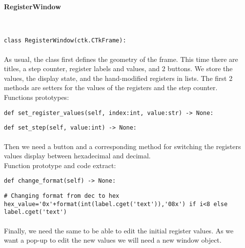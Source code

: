 \documentclass{article}
\newcommand{\subsubsubsection}[1]{\paragraph{#1}\mbox{}\\}
\begin{document}
\paragraph{}
\subsubsubsection{RegisterWindow}
\begin{lstlisting}[language=MyPython]
class RegisterWindow(ctk.CTkFrame):
\end{lstlisting}
\paragraph{}

As usual, the class first defines the geometry of the frame. This time there are titles, a step counter, register labels and values, and 2 buttons. We store the values, the display state, and the hand-modified registers in lists. The first 2 methods are setters for the values of the registers and the step counter. \\
Functions prototypes: \\

\begin{lstlisting}[language=MyPython]
def set_register_values(self, index:int, value:str) -> None:
\end{lstlisting}
\begin{lstlisting}[language=MyPython]
def set_step(self, value:int) -> None:
\end{lstlisting}
\paragraph{}

Then we need a button and a corresponding method for switching the registers values display between hexadecimal and decimal. \\
Function prototype and code extract: \\

\begin{lstlisting}[language=MyPython]
def change_format(self) -> None:
\end{lstlisting}
\begin{lstlisting}[language=MyPython]
# Changing format from dec to hex
hex_value='0x'+format(int(label.cget('text')),'08x') if i<8 else label.cget('text')
\end{lstlisting}
\paragraph{}

Finally, we need the same to be able to edit the initial register values. As we want a pop-up to edit the new values we will need a new window object.
\end{document}
